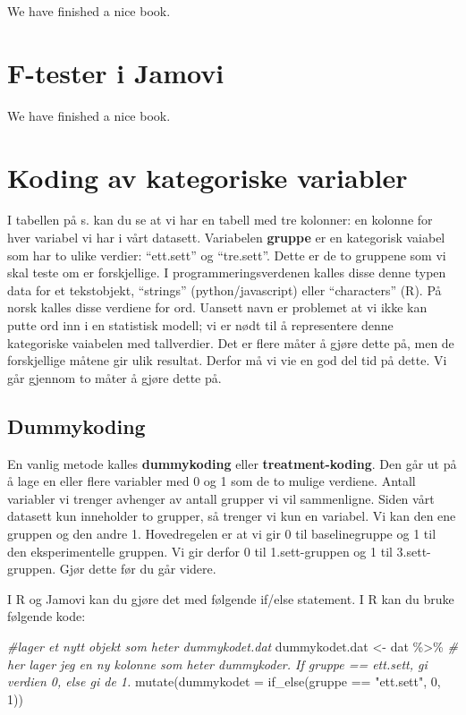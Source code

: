 \documentclass[
]{book}
\newenvironment{Shaded}{\begin{snugshade}}{\end{snugshade}}
\newcommand{\AttributeTok}[1]{\textcolor[rgb]{0.77,0.63,0.00}{#1}}
\newcommand{\CommentTok}[1]{\textcolor[rgb]{0.56,0.35,0.01}{\textit{#1}}}
\newcommand{\DecValTok}[1]{\textcolor[rgb]{0.00,0.00,0.81}{#1}}
\newcommand{\FunctionTok}[1]{\textcolor[rgb]{0.00,0.00,0.00}{#1}}
\newcommand{\NormalTok}[1]{#1}
\newcommand{\OtherTok}[1]{\textcolor[rgb]{0.56,0.35,0.01}{#1}}
\newcommand{\SpecialCharTok}[1]{\textcolor[rgb]{0.00,0.00,0.00}{#1}}
\newcommand{\StringTok}[1]{\textcolor[rgb]{0.31,0.60,0.02}{#1}}
\begin{document}
We have finished a nice book.

\hypertarget{f-tester-i-jamovi}{%
\chapter{F-tester i Jamovi}\label{f-tester-i-jamovi}}

We have finished a nice book.

\hypertarget{koding-av-kategoriske-variabler-1}{%
\chapter{Koding av kategoriske variabler}\label{koding-av-kategoriske-variabler-1}}

I tabellen på s. kan du se at vi har en tabell med tre kolonner: en kolonne for hver variabel vi har i vårt datasett. Variabelen \textbf{gruppe} er en kategorisk vaiabel som har to ulike verdier: ``ett.sett'' og ``tre.sett''. Dette er de to gruppene som vi skal teste om er forskjellige. I programmeringsverdenen kalles disse denne typen data for et tekstobjekt, ``strings'' (python/javascript) eller ``characters'' (R). På norsk kalles disse verdiene for ord. Uansett navn er problemet at vi ikke kan putte ord inn i en statistisk modell; vi er nødt til å representere denne kategoriske vaiabelen med tallverdier. Det er flere måter å gjøre dette på, men de forskjellige måtene gir ulik resultat. Derfor må vi vie en god del tid på dette. Vi går gjennom to måter å gjøre dette på.

\hypertarget{dummykoding-1}{%
\section{Dummykoding}\label{dummykoding-1}}

En vanlig metode kalles \textbf{dummykoding} eller \textbf{treatment-koding}. Den går ut på å lage en eller flere variabler med 0 og 1 som de to mulige verdiene. Antall variabler vi trenger avhenger av antall grupper vi vil sammenligne. Siden vårt datasett kun inneholder to grupper, så trenger vi kun en variabel. Vi kan den ene gruppen og den andre 1. Hovedregelen er at vi gir 0 til baselinegruppe og 1 til den eksperimentelle gruppen. Vi gir derfor 0 til 1.sett-gruppen og 1 til 3.sett-gruppen. Gjør dette før du går videre.

I R og Jamovi kan du gjøre det med følgende if/else statement. I R kan du bruke følgende kode:

\begin{Shaded}
\begin{Highlighting}[]
\CommentTok{\#lager et nytt objekt som heter dummykodet.dat}
\NormalTok{dummykodet.dat }\OtherTok{\textless{}{-}}\NormalTok{ dat }\SpecialCharTok{\%\textgreater{}\%}
  \CommentTok{\# her lager jeg en ny kolonne som heter dummykoder. If gruppe == \textquotesingle{}ett.sett\textquotesingle{}, gi verdien 0, else gi de 1.}
  \FunctionTok{mutate}\NormalTok{(}\AttributeTok{dummykodet =} \FunctionTok{if\_else}\NormalTok{(gruppe }\SpecialCharTok{==} \StringTok{"ett.sett"}\NormalTok{, }\DecValTok{0}\NormalTok{, }\DecValTok{1}\NormalTok{))}
\end{Highlighting}
\end{Shaded}
\end{document}

